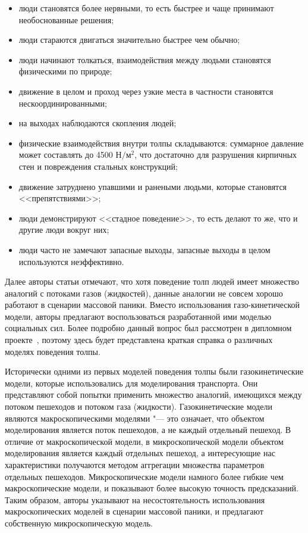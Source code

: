 \begin{itemize}
  \item люди становятся более нервными, то есть быстрее и чаще принимают необоснованные решения;
  \item люди стараются двигаться значительно быстрее чем обычно;
  \item люди начинают толкаться, взаимодействия между людьми становятся физическими по природе;
  \item движение в целом и проход через узкие места в частности становятся нескоординированными;
  \item на выходах наблюдаются скопления людей;
  \item физические взаимодействия внутри толпы складываются: суммарное давление может составлять до 4500 $\text{Н} / \text{м}^2$,
        что достаточно для разрушения кирпичных стен и повреждения стальных конструкций;
  \item движение затруднено упавшими и ранеными людьми, которые становятся <<препятствиями>>;
  \item люди демонстрируют <<стадное поведение>>, то есть делают то же, что и другие люди вокруг них;
  \item люди часто не замечают запасные выходы, запасные выходы в целом используются неэффективно.
\end{itemize}

Далее авторы статьи отмечают, что хотя поведение толп людей имеет множество аналогий с потоками газов (жидкостей), данные аналогии не совсем хорошо работают в сценарии массовой паники.
Вместо использования газо-кинетической модели, авторы предлагают воспользоваться разработанной ими моделью социальных сил.
Более подробно данный вопрос был рассмотрен в дипломном проекте~\cite{my_diploma}, поэтому здесь будет представлена краткая справка о различных моделях поведения толпы.

Исторически одними из первых моделей поведения толпы были газокинетические модели, которые использовались для моделирования транспорта.
Они представляют собой попытки применить множество аналогий, имеющихся между потоком пешеходов и потоком газа (жидкости).
Газокинетические модели являются макроскопическими моделями "--- это означает, что объектом моделирования является поток пешеходов, а не каждый отдельный пешеход.
В отличие от макроскопической модели, в микроскопической модели объектом моделирования является каждый отдельных пешеход,
а интересующие нас характеристики получаются методом аггрегации множества параметров отдельных пешеходов.
Микроскопические модели намного более гибкие чем макроскопические модели, и показывают более высокую точность предсказаний.
Таким образом, авторы указывают на несостоятельность использования макроскопических моделей в сценарии массовой паники, и предлагают собственную микроскопическую модель.

